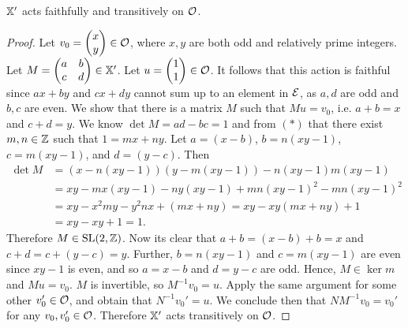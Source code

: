 \documentclass[a4paper, 11pt]{article}
\begin{document}
\begin{lem}
$\mathbb{X}'$ acts faithfully and transitively on $\mathcal{O}$.
\begin{proof}
Let $v_0=\begin{pmatrix}x \\ y\end{pmatrix}\in\mathcal{O}$, where $x,y$ are both odd and relatively prime integers. Let $M=\begin{pmatrix}a & b \\ c & d
\end{pmatrix}\in\mathbb{X}'$. Let $u=\begin{pmatrix}1 \\ 1 \end{pmatrix}\in\mathcal{O}$. It follows that this action is faithful since $ax+by$ and $cx+dy$ cannot sum up to an element in $\mathcal{E}$, as $a,d$ are odd and $b,c$ are even. We show that there is a matrix $M$ such that $Mu=v_0$, i.e. $a+b=x$ and $c+d=y$. We know $\det M=ad-bc=1$ and from $(*)$ that there exist $m,n\in\mathbb{Z}$ such that $1=mx+ny$. Let $a=(x-b)$, $b=n(xy-1)$, $c=m(xy-1)$, and $d=(y-c)$. Then
\begin{align*}
\det M&=(x-n(xy-1))(y-m(xy-1))-n(xy-1)m(xy-1)\\
&=xy-mx(xy-1)-ny(xy-1)+mn(xy-1)^2-mn(xy-1)^2\\
&=xy-x^2my-y^2nx+(mx+ny)=xy-xy(mx+ny)+1\\
&=xy-xy+1=1.
\end{align*}
Therefore $M\in\mathrm{SL}(2,\mathbb{Z})$. Now its clear that $a+b=(x-b)+b=x$ and $c+d=c+(y-c)=y$. Further, $b=n(xy-1)$ and $c=m(xy-1)$ are even since $xy-1$ is even, and so $a=x-b$ and $d=y-c$ are odd. Hence, $M\in\ker m$ and $Mu=v_0$. $M$ is invertible, so $M^{-1}v_0=u.$ Apply the same argument for some other $v_0'\in\mathcal{O}$, and obtain that $N^{-1}v_0'=u.$ We conclude then that $NM^{-1}v_0=v_0'$ for any $v_0,v_0'\in\mathcal{O}$. Therefore $\mathbb{X}'$ acts transitively on $\mathcal{O}$.
\end{proof}
\end{lem}
\end{document}
